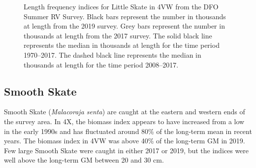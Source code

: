 \documentclass[11pt]{book}
\begin{document}
\begin{figure}[htb]

{\centering {} 

}

\caption{Length frequency indices for Little Skate in 4VW from the DFO Summer RV Survey. Black bars represent the number in thousands at length from the 2019 survey. Grey bars represent the number in thousands at length from the 2017 survey. The solid black line represents the median in thousands at length for the time period 1970--2017. The dashed black line represents the median in thousands at length for the time period 2008--2017.}\label{fig:99-fig-littleskate-lengthfreq4VW}
\end{figure}
\clearpage

\hypertarget{smooth-skate}{%
\subsection{Smooth Skate}\label{smooth-skate}}

Smooth Skate (\emph{Malacoraja senta}) are caught at the eastern and western ends of the survey area. In 4X, the biomass index appears to have increased from a low in the early 1990s and has fluctuated around 80\% of the long-term mean in recent years. The biomass index in 4VW was above 40\% of the long-term GM in 2019. Few large Smooth Skate were caught in either 2017 or 2019, but the indices were well above the long-term GM between 20 and 30 cm.
\end{document}

